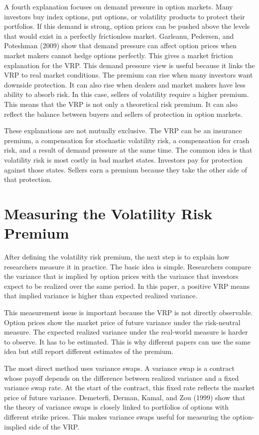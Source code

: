 \documentclass[11pt,a4paper]{article}
\begin{document}
A fourth explanation focuses on demand pressure in option markets. Many investors buy index options, put options, or volatility products to protect their portfolios. If this demand is strong, option prices can be pushed above the levels that would exist in a perfectly frictionless market. Garleanu, Pedersen, and Poteshman (2009) show that demand pressure can affect option prices when market makers cannot hedge options perfectly. This gives a market friction explanation for the VRP. This demand pressure view is useful because it links the VRP to real market conditions. The premium can rise when many investors want downside protection. It can also rise when dealers and market makers have less ability to absorb risk. In this case, sellers of volatility require a higher premium. This means that the VRP is not only a theoretical risk premium. It can also reflect the balance between buyers and sellers of protection in option markets.

These explanations are not mutually exclusive. The VRP can be an insurance premium, a compensation for stochastic volatility risk, a compensation for crash risk, and a result of demand pressure at the same time. The common idea is that volatility risk is most costly in bad market states. Investors pay for protection against those states. Sellers earn a premium because they take the other side of that protection.

\section{Measuring the Volatility Risk Premium}

After defining the volatility risk premium, the next step is to explain how researchers measure it in practice. The basic idea is simple. Researchers compare the variance that is implied by option prices with the variance that investors expect to be realized over the same period. In this paper, a positive VRP means that implied variance is higher than expected realized variance.

This measurement issue is important because the VRP is not directly observable. Option prices show the market price of future variance under the risk-neutral measure. The expected realized variance under the real-world measure is harder to observe. It has to be estimated. This is why different papers can use the same idea but still report different estimates of the premium.

The most direct method uses variance swaps. A variance swap is a contract whose payoff depends on the difference between realized variance and a fixed variance swap rate. At the start of the contract, this fixed rate reflects the market price of future variance. Demeterfi, Derman, Kamal, and Zou (1999) show that the theory of variance swaps is closely linked to portfolios of options with different strike prices. This makes variance swaps useful for measuring the option-implied side of the VRP.
\end{document}
